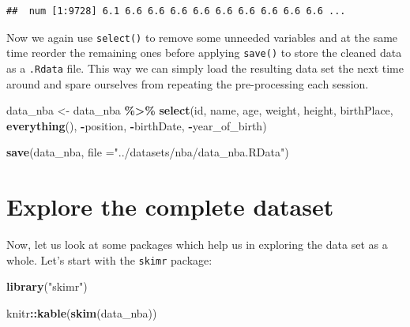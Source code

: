 \documentclass[
]{book}
\newenvironment{Shaded}{\begin{snugshade}}{\end{snugshade}}
\newcommand{\AttributeTok}[1]{\textcolor[rgb]{0.13,0.29,0.53}{#1}}
\newcommand{\FunctionTok}[1]{\textcolor[rgb]{0.13,0.29,0.53}{\textbf{#1}}}
\newcommand{\NormalTok}[1]{#1}
\newcommand{\OtherTok}[1]{\textcolor[rgb]{0.56,0.35,0.01}{#1}}
\newcommand{\SpecialCharTok}[1]{\textcolor[rgb]{0.81,0.36,0.00}{\textbf{#1}}}
\newcommand{\StringTok}[1]{\textcolor[rgb]{0.31,0.60,0.02}{#1}}
\begin{document}
\begin{verbatim}
##  num [1:9728] 6.1 6.6 6.6 6.6 6.6 6.6 6.6 6.6 6.6 6.6 ...
\end{verbatim}

Now we again use \texttt{select()} to remove some unneeded variables and at the same time reorder the remaining ones before applying \texttt{save()} to store the cleaned data as a \texttt{.Rdata} file. This way we can simply load the resulting data set the next time around and spare ourselves from repeating the pre-processing each session.

\begin{Shaded}
\begin{Highlighting}[]
\NormalTok{data\_nba }\OtherTok{\textless{}{-}}\NormalTok{ data\_nba }\SpecialCharTok{\%\textgreater{}\%}
  \FunctionTok{select}\NormalTok{(id, name, age, weight, height, birthPlace, }\FunctionTok{everything}\NormalTok{(), }\SpecialCharTok{{-}}\NormalTok{position, }\SpecialCharTok{{-}}\NormalTok{birthDate, }\SpecialCharTok{{-}}\NormalTok{year\_of\_birth)}

\FunctionTok{save}\NormalTok{(data\_nba, }\AttributeTok{file =}\StringTok{"../datasets/nba/data\_nba.RData"}\NormalTok{)}
\end{Highlighting}
\end{Shaded}

\hypertarget{explore-the-complete-dataset}{%
\section{Explore the complete dataset}\label{explore-the-complete-dataset}}

Now, let us look at some packages which help us in exploring the data set as a whole. Let's start with the \texttt{skimr} package:

\begin{Shaded}
\begin{Highlighting}[]
\FunctionTok{library}\NormalTok{(}\StringTok{"skimr"}\NormalTok{)}

\NormalTok{knitr}\SpecialCharTok{::}\FunctionTok{kable}\NormalTok{(}\FunctionTok{skim}\NormalTok{(data\_nba))}
\end{Highlighting}
\end{Shaded}
\end{document}
